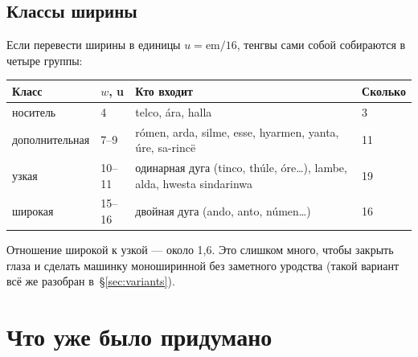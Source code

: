 \documentclass[11pt,a4paper]{article}
\begin{document}
\subsection{Классы ширины}

Если перевести ширины в единицы $u = \mathrm{em}/16$, тенгвы сами собой собираются в четыре группы:

\begin{center}\small
\begin{tabular}{@{}llll@{}}
\toprule
Класс & $w$, u & Кто входит & Сколько \\
\midrule
носитель & 4 & telco, ára, halla & 3 \\
дополнительная & 7--9 & rómen, arda, silme, esse, hyarmen, yanta, úre, sa-rincë & 11 \\
узкая & 10--11 & одинарная дуга (tinco, thúle, óre\ldots), lambe, alda, hwesta sindarinwa & 19 \\
широкая & 15--16 & двойная дуга (ando, anto, númen\ldots) & 16 \\
\bottomrule
\end{tabular}
\end{center}

Отношение широкой к узкой — около 1,6. Это слишком много, чтобы закрыть глаза и сделать машинку моноширинной без заметного уродства (такой вариант всё же разобран в~\S\ref{sec:variants}).

\section{Что уже было придумано}
\end{document}
